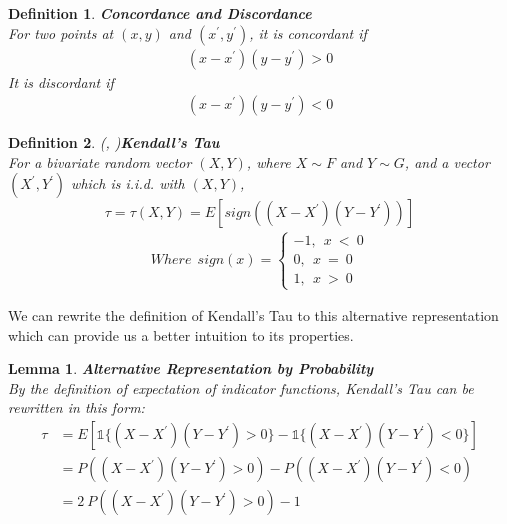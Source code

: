 \documentclass[12pt]{report}
\newtheorem{lemma}{Lemma}[subsection]
\newtheorem{definition}{Definition}[subsection]
\newcommand{\1}{\mathbf{1}}
\begin{document}
\begin{flushleft}
\begin{definition}\label{concorddiscorddef}\textbf{Concordance and Discordance} \\

For two points at $(x,y)$ and $(x^{'},y^{'})$, it is concordant if 
\begin{align*}
(x - x^{'})(y - y^{'}) > 0
\end{align*}
It is discordant if 
\begin{align*}
(x - x^{'})(y - y^{'}) < 0
\end{align*}
\end{definition}

\begin{definition}\label{KendallTauDefinition}
\textit{\normalfont(\cite{KendallTauAuthor1938}, \cite{HofertBook})}\:\textbf{Kendall's Tau} \\
For a bivariate random vector $(X,Y)$, where $X \sim F$ and $Y \sim G$, and a vector $(X^{'},Y^{'})$ which is i.i.d. with $(X,Y)$,
\begin{equation*}
\tau = \tau(X,Y) = E[sign ( (X - X^{'})(Y - Y^{'}) )]
\end{equation*}
\begin{align*}
Where \: \: sign(x) = 
\left\{ 
\begin{array}{rll}
-1, \: \:  x \: < \: 0 \\
0, \: \: x \: = \: 0 \\
1, \: \: x \: > \: 0
\end{array}
\right.
\end{align*}
\end{definition}

We can rewrite the definition of Kendall's Tau to this alternative representation which can provide us a better intuition to its properties.

\begin{lemma}
\label{KendallTauGeneralizationProb}
\textit{\normalfont\parencite{HofertBook}}\:\textbf{Alternative Representation by Probability}\\
By the definition of expectation of indicator functions, Kendall's Tau can be rewritten in this form:
\begin{align*}
\tau &= E[\mathds{1}\{(X - X^{'})(Y - Y^{'})  >  0 \} - \mathds{1} \{ (X - X^{'})(Y - Y^{'})  <  0 \}] \\
&= P \left( (X - X^{'})(Y - Y^{'}) > 0  \right) - P \left( (X - X^{'})(Y - Y^{'}) < 0  \right)\\
&= 2 \: P \left( (X - X^{'})(Y - Y^{'}) > 0  \right) - 1
\end{align*}
\end{lemma}


\end{flushleft}
\end{document}
